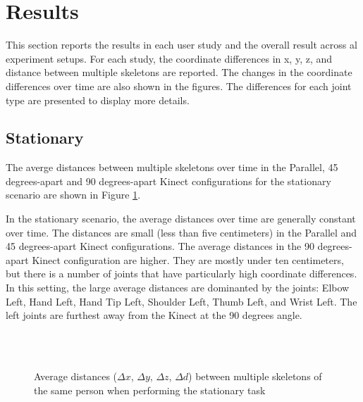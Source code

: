 \documentclass{sigchi}
\begin{document}
\section{Results}
\label{sec:evaluation}

This section reports the results in each user study and the overall result across al experiment setups. For each study, the coordinate differences in x, y, z, and distance between multiple skeletons are reported. The changes in the coordinate differences over time are also shown in the figures. The differences for each joint type are presented to display more details.

\subsection{Stationary}

The averge distances between multiple skeletons over time in the Parallel, 45 degrees-apart and 90 degrees-apart Kinect configurations for the stationary scenario are shown in Figure \ref{fig:results_stationary}.

In the stationary scenario, the average distances over time are generally constant over time. The distances are small (less than five centimeters) in the Parallel and 45 degrees-apart Kinect configurations. The average distances in the 90 degrees-apart Kinect configuration are higher. They are mostly under ten centimeters, but there is a number of joints that have particularly high coordinate differences. In this setting, the large average distances are dominanted by the joints: Elbow Left, Hand Left, Hand Tip Left, Shoulder Left, Thumb Left, and Wrist Left. The left joints are furthest away from the Kinect at the 90 degrees angle.

\begin{figure}
  \centering

  
   \\
  
   \\
  
  

  \caption{Average distances ($\Delta x$, $\Delta y$, $\Delta z$, $\Delta d$) between multiple skeletons
    of the same person when performing the stationary task}

  \label{fig:results_stationary}
\end{figure}
\end{document}
